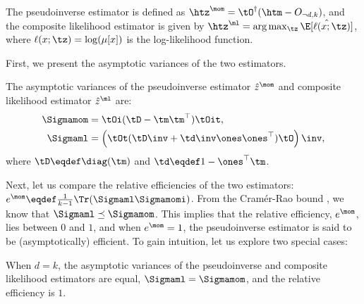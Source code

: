 The pseudoinverse estimator is defined as $\htz^\mom = \tO^\dagger (\htm - O_{\neg d, k})$, and the composite likelihood estimator is given by $\htz^\ml = \arg\max_{\tz} \hat\E[\ell(x; \tz)]$,
where $\ell(x; \tz) = \log(\mu[x])$ is the log-likelihood function.


First, we present the asymptotic variances of the two estimators.
\begin{lemma}
  \label{lem:mom-pw-variance}
  The asymptotic variances of the pseudoinverse estimator $\hat z^\mom$
  and composite likelihood estimator $\hat z^\ml$ are:
  \begin{align*}
    \Sigmamom 
      &= \tOi (\tD - \tm \tm^\top) \tOit, \\
    \Sigmaml 
      &=
      \left( \tOt (\tD\inv + \td\inv \ones\ones^\top) \tO \right)\inv,
  \end{align*}
  where $\tD \eqdef \diag(\tm)$ and $\td \eqdef 1 - \ones^\top\tm$.
\end{lemma}

Next, let us compare the relative efficiencies of the two estimators:
$e^\mom \eqdef \frac{1}{k-1} \Tr(\Sigmaml
\Sigmamomi)$. 
From the Cram\'{e}r-Rao bound \cite{vaart98asymptotic}, we know that
$\Sigmaml \preceq \Sigmamom$. This implies that the relative efficiency,
$e^\mom$, lies between $0$ and $1$, and when $e^\mom = 1$, the
pseudoinverse estimator is said to be (asymptotically) efficient.  
To gain intuition, let us explore two special cases:

\begin{lemma}[Relative efficiency when $d = k$]
  When $d = k$, the asymptotic variances of the pseudoinverse and
  composite likelihood estimators are equal, $\Sigmaml = \Sigmamom$, and the relative efficiency is $1$.
\end{lemma}

